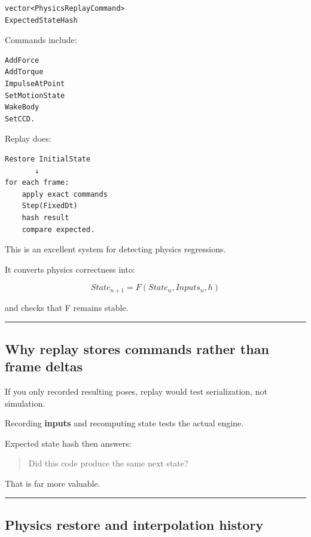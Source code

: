 \begin{verbatim}
vector<PhysicsReplayCommand>
ExpectedStateHash
\end{verbatim}

Commands include:

\begin{verbatim}
AddForce
AddTorque
ImpulseAtPoint
SetMotionState
WakeBody
SetCCD.
\end{verbatim}

Replay does:

\begin{verbatim}
Restore InitialState
       ↓
for each frame:
    apply exact commands
    Step(FixedDt)
    hash result
    compare expected.
\end{verbatim}

This is an excellent system for detecting physics regressions.

It converts physics correctness into:

\[
\boxed{
State_{n+1}
=
F(State_n,Inputs_n,h)
}
\]

and checks that F remains stable.

\begin{center}\rule{0.5\linewidth}{0.5pt}\end{center}

\subsection{Why replay stores commands rather than frame deltas}\label{06-engine-ii-ch038-why-replay-stores-commands-rather-than-frame-deltas}

\hypertarget{06-engine-ii-ch038-why-replay-stores-commands-rather-than-frame-deltas}{}

If you only recorded resulting poses, replay would test serialization, not simulation.

Recording \textbf{inputs} and recomputing state tests the actual engine.

Expected state hash then answers:

\begin{quote}
Did this code produce the same next state?
\end{quote}

That is far more valuable.

\begin{center}\rule{0.5\linewidth}{0.5pt}\end{center}

\subsection{Physics restore and interpolation history}\label{06-engine-ii-ch038-physics-restore-and-interpolation-history}

